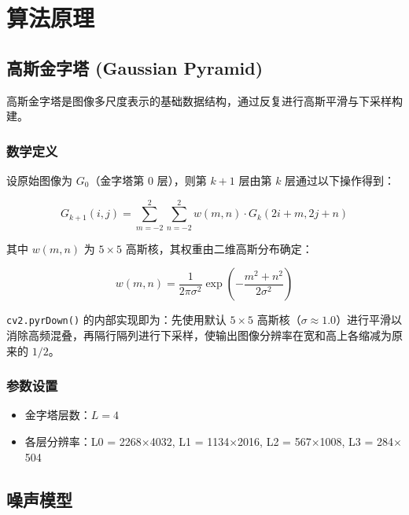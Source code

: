 \documentclass[12pt,a4paper]{ctexart}
\begin{document}
\newpage

\section{算法原理}

\subsection{高斯金字塔 (Gaussian Pyramid)}

高斯金字塔是图像多尺度表示的基础数据结构，通过反复进行高斯平滑与下采样构建。

\subsubsection{数学定义}

设原始图像为 $G_0$（金字塔第 0 层），则第 $k+1$ 层由第 $k$ 层通过以下操作得到：

\begin{equation}
    G_{k+1}(i,j) = \sum_{m=-2}^{2} \sum_{n=-2}^{2} w(m,n) \cdot G_k(2i+m, 2j+n)
    \label{eq:pyramid}
\end{equation}

其中 $w(m,n)$ 为 $5 \times 5$ 高斯核，其权重由二维高斯分布确定：

\begin{equation}
    w(m,n) = \frac{1}{2\pi\sigma^2} \exp\left(-\frac{m^2+n^2}{2\sigma^2}\right)
    \label{eq:gauss_kernel}
\end{equation}

\texttt{cv2.pyrDown()} 的内部实现即为：先使用默认 $5\times5$ 高斯核（$\sigma \approx 1.0$）进行平滑以消除高频混叠，再隔行隔列进行下采样，使输出图像分辨率在宽和高上各缩减为原来的 $1/2$。

\subsubsection{参数设置}

\begin{itemize}
    \item 金字塔层数：$L = 4$
    \item 各层分辨率：L0 = 2268$\times$4032, L1 = 1134$\times$2016, L2 = 567$\times$1008, L3 = 284$\times$504
\end{itemize}

\subsection{噪声模型}
\end{document}
